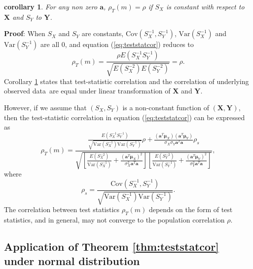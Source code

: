 \documentclass[review]{elsarticle}
\newtheorem{corollary}{corollary}
\newcommand{\cov}{\text{Cov}}
\newcommand{\var}{\text{Var}}
\newcommand{\popucor}{the correlation of underlying observed data}
\begin{document}
\begin{corollary}\label{thm:lineartransformation} 
	For any non zero $\bm a$, $\rho_T(m)=\rho$ if $S_X$ is constant with respect to 
	$\bm X$ and $S_Y$ to $\bm Y$. 
\end{corollary}
\textbf{Proof}: When $S_X$ and $S_Y$ are constants, $\cov(S_X^{-1}, S_Y^{-1})$, $\var(S_X^{-1}) 
$ and $\var(S_Y^{-1})$ are all 0, and equation (\ref{eq:teststatcor}) reduces to 
\begin{equation}
\rho_T(m) = \frac{\rho E(S_X^{-1}S_Y^{-1})}{\sqrt{E(S_X^{-2})E(S_Y^{-2})}} = \rho.
\end{equation}
Corollary \ref{thm:lineartransformation} states that test-statistic correlation and \popucor~are 
equal under linear transformation of $\bm X$ and $\bm Y$. 

However, if we 
assume that $(S_X, S_Y)$ is a non-constant function of $(\bm X, \bm Y)$, then the test-statistic 
correlation in equation (\ref{eq:teststatcor}) can be expressed as  
\begin{equation}
\rho_T(m) = \frac{ \frac{E(S_X^{-1}S_Y^{-1})}
	{\sqrt{\var(S_X^{-1})\var(S_Y^{-1})}}\rho + \frac{(\bm a^T\bm \mu_X)(\bm a^T\bm 
		\mu_Y)}{\sigma_X\sigma_Y\bm a^T\bm a} \rho_s	
}{\sqrt{\left[ \frac{E(S_X^{-2})}{\var(S_X^{-1})} + \frac{(\bm a^T\bm \mu_X)^2}{\sigma_X^2\bm 
		a^T\bm a}\right]\left[ \frac{E(S_Y^{-2})}{\var(S_Y^{-1})} + \frac{(\bm a^T\bm 
		\mu_Y)^2}{\sigma_Y^2\bm a^T\bm a}\right]}}, 
\end{equation}
where 
\begin{equation}
\rho_s = \frac{\cov(S_X^{-1},S_Y^{-1})}{\sqrt{\var(S_X^{-1})\var(S_Y^{-1})}}.
\end{equation}
The correlation between test statistics $\rho_T(m)$ depends on the form of test statistics, and 
in general,  may not converge to the population correlation $\rho$. 

\subsection{Application of Theorem \ref{thm:teststatcor} under normal distribution}
\end{document}
